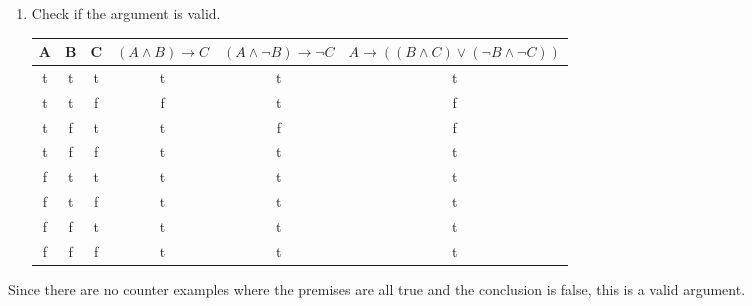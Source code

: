 \documentclass[12pt]{article}
\begin{document}
\begin{enumerate}
\begin{center}
\begin{tabular}{ll}
    \end{tabular}
  \end{center}
  \newpage
  \item Check if the argument is valid.
  \begin{center}
    \begin{tabular}{ccc|ccc}
      A & B & C & $(A \land B) \rightarrow C$ & $(A \land \neg B) \rightarrow \neg C$ & $A \rightarrow ((B \land C) \lor (\neg B \land \neg C))$ \\ \hline
      t & t & t &  t  &  t  &  t  \\
      t & t & f &  f  &  t  &  f  \\
      t & f & t &  t  &  f  &  f  \\
      t & f & f &  t  &  t  &  t  \\
      f & t & t &  t  &  t  &  t  \\
      f & t & f &  t  &  t  &  t  \\
      f & f & t &  t  &  t  &  t  \\
      f & f & f &  t  &  t  &  t
    \end{tabular}
  \end{center}
\end{enumerate}

\noindent
Since there are no counter examples where the premises are all true and the 
conclusion is false, this is a valid argument.
\end{document}
